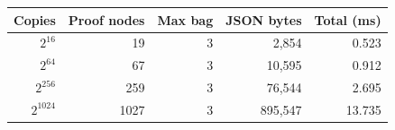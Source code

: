 \begin{tabular}{rrrrr}
\toprule
Copies & Proof nodes & Max bag & JSON bytes & Total (ms) \\
\midrule
$2^{16}$ & 19 & 3 & 2,854 & 0.523 \\
$2^{64}$ & 67 & 3 & 10,595 & 0.912 \\
$2^{256}$ & 259 & 3 & 76,544 & 2.695 \\
$2^{1024}$ & 1027 & 3 & 895,547 & 13.735 \\
\bottomrule
\end{tabular}

